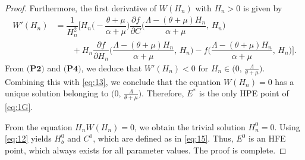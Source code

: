 \documentclass[11pt]{article}
\theoremstyle{definition}
\theoremstyle{remark}
\numberwithin{equation}{section}
\begin{document}
\begin{proof}
Furthermore, the first derivative of $W(H_n)$ with $H_n>0$ is given by
\begin{equation*}
\begin{split}
   W'(H_n) &= \dfrac{1}{H_n^2}\bigg[H_n\bigg(-\dfrac{\theta + \mu}{\alpha + \mu}\bigg)\dfrac{\partial f}{\partial C}\bigg(\dfrac{\Lambda - (\theta + \mu)H_n}{\alpha + \mu},\,H_n\bigg)\\
    &\qquad+ H_n\dfrac{\partial f}{\partial H_n}\bigg(\dfrac{\Lambda - (\theta + \mu)H_n}{\alpha + \mu},\,H_n\bigg) - f\bigg(\dfrac{\Lambda - (\theta + \mu)H_n}{\alpha + \mu},\,H_n\bigg)\bigg].
\end{split}
\end{equation*}
From $\textbf{(P2)}$ and $\textbf{(P4)}$, we deduce that $W'(H_n) < 0$ for $H_n \in \big(0,\,\frac{\Lambda}{\theta + \mu}\big)$. 
Combining this with \eqref{eq:13}, we conclude that the equation $W(H_n) = 0$  has a unique solution belonging to $\big(0,\,\frac{\Lambda}{\theta + \mu}\big)$. 
Therefore, $E^*$ is the only HPE point of \eqref{eq:1G}.

From the equation $H_nW(H_n) = 0$, we obtain the trivial solution $H_n^0 = 0$. 
Using \eqref{eq:12} yields $H_b^0$ and $C^0$, which are defined as in  \eqref{eq:15}. 
Thus, $E^0$ is an HFE point, which always exists for all parameter values. 
The proof is complete.
\end{proof}
\end{document}
